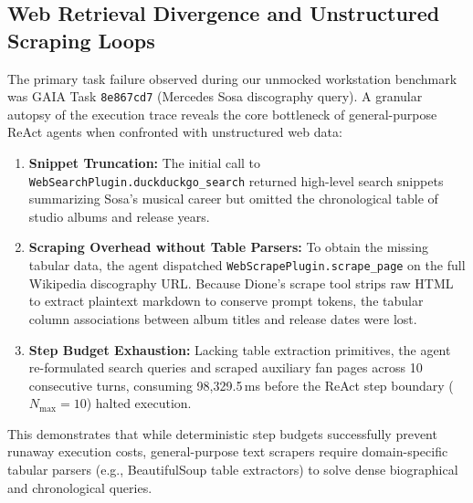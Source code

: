 \documentclass[conference,a4paper]{IEEEtran}
\begin{document}
\subsection{Web Retrieval Divergence and Unstructured Scraping Loops}
The primary task failure observed during our unmocked workstation benchmark was GAIA Task \texttt{8e867cd7} (Mercedes Sosa discography query). A granular autopsy of the execution trace reveals the core bottleneck of general-purpose ReAct agents when confronted with unstructured web data:
\begin{enumerate}
    \item \textbf{Snippet Truncation:} The initial call to \texttt{WebSearchPlugin.duckduckgo\_search} returned high-level search snippets summarizing Sosa's musical career but omitted the chronological table of studio albums and release years.
    \item \textbf{Scraping Overhead without Table Parsers:} To obtain the missing tabular data, the agent dispatched \texttt{WebScrapePlugin.scrape\_page} on the full Wikipedia discography URL. Because Dione's scrape tool strips raw HTML to extract plaintext markdown to conserve prompt tokens, the tabular column associations between album titles and release dates were lost.
    \item \textbf{Step Budget Exhaustion:} Lacking table extraction primitives, the agent re-formulated search queries and scraped auxiliary fan pages across 10 consecutive turns, consuming 98,329.5\,ms before the ReAct step boundary ($N_{\text{max}} = 10$) halted execution.
\end{enumerate}
This demonstrates that while deterministic step budgets successfully prevent runaway execution costs, general-purpose text scrapers require domain-specific tabular parsers (e.g., BeautifulSoup table extractors) to solve dense biographical and chronological queries.
\end{document}
